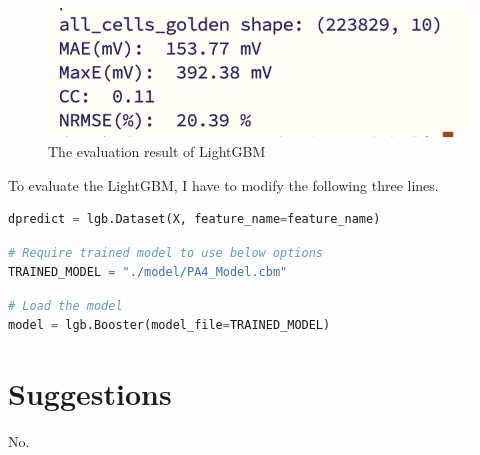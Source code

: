 \documentclass{article}
\begin{document}
\begin{figure}[H]
    \centering
\includegraphics*[width=0.5\linewidth]{./img/2024-06-13-20-25-32.png}
\caption{The evaluation result of LightGBM}
\end{figure}



To evaluate the LightGBM, I have to modify the following three lines.

\begin{lstlisting}[language={python}, caption={LightGBM\_Evaluation change 1}, label={c1}]
dpredict = lgb.Dataset(X, feature_name=feature_name)
\end{lstlisting}


\begin{lstlisting}[language={python}, caption={LightGBM\_Evaluation change 2}, label={c2}]
# Require trained model to use below options
TRAINED_MODEL = "./model/PA4_Model.cbm"
\end{lstlisting}

\begin{lstlisting}[language={python}, caption={LightGBM\_Evaluation change 3}, label={c3}]
# Load the model
model = lgb.Booster(model_file=TRAINED_MODEL)
\end{lstlisting}




\section{Suggestions}

No.


\end{document}
